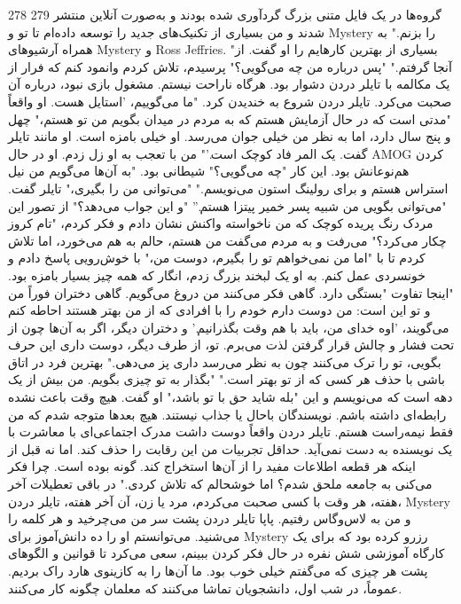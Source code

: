 278
279
گروه‌ها در یک فایل متنی بزرگ گردآوری شده بودند و به‌صورت آنلاین منتشر شدند
و من بسیاری از تکنیک‌های جدید را توسعه داده‌ام تا تو و Mystery را بزنم."
به همراه آرشیوهای Mystery و Ross Jeffries. "بسیاری از بهترین کارهایم را
او گفت.
از آنجا گرفتم."
"پس درباره من چه می‌گویی؟" پرسیدم، تلاش کردم وانمود کنم که
فرار از یک مکالمه با تایلر دردن دشوار بود. هرگاه
ناراحت نیستم.
مشغول بازی نبود، درباره آن صحبت می‌کرد.
تایلر دردن شروع به خندیدن کرد. "ما می‌گوییم، 'استایل هست. او واقعاً
"مدتی است که در حال آزمایش هستم که به مردم در میدان بگویم من تو هستم،"
چهل و پنج سال دارد، اما به نظر من خیلی جوان می‌رسد. او خیلی بامزه است. او مانند
تایلر گفت.
یک المر فاد کوچک است.’"
من با تعجب به او زل زدم. او در حال AMOG کردن هم‌نوعانش بود. این کار
"چه می‌گویی؟"
شیطانی بود.
"به آن‌ها می‌گویم من نیل استراس هستم و برای رولینگ استون می‌نویسم."
"می‌توانی من را بگیری،" تایلر گفت. "می‌توانی بگویی من شبیه پسر خمیر پیتزا هستم.”
"و این جواب می‌دهد؟" از تصور این مردک رنگ پریده کوچک که
من ناخواسته واکنش نشان دادم و فکر کردم، "تام کروز چکار می‌کرد؟"
می‌رفت و به مردم می‌گفت من هستم، حالم به هم می‌خورد، اما تلاش کردم تا با
"اما من نمی‌خواهم تو را بگیرم، دوست من،" با خوش‌رویی پاسخ دادم و
خونسردی عمل کنم.
به او یک لبخند بزرگ زدم، انگار که همه چیز بسیار بامزه بود. "اینجا تفاوت
"بستگی دارد. گاهی فکر می‌کنند من دروغ می‌گویم. گاهی دختران فوراً
من و تو این است: من دوست دارم خودم را با افرادی که از من بهتر هستند احاطه کنم
می‌گویند، 'اوه خدای من، باید با هم وقت بگذرانیم.' و دختران دیگر، اگر به آن‌ها
چون از تحت فشار و چالش قرار گرفتن لذت می‌برم. تو، از طرف دیگر، دوست داری
این حرف بگویی، تو را ترک می‌کنند چون به نظر می‌رسد داری پز می‌دهی."
بهترین فرد در اتاق باشی با حذف هر کسی که از تو بهتر است."
"بگذار به تو چیزی بگویم. من بیش از یک دهه است که می‌نویسم و این
"بله شاید حق با تو باشد،" او گفت.
هیچ وقت باعث نشده رابطه‌ای داشته باشم. نویسندگان باحال یا جذاب نیستند. هیچ
بعدها متوجه شدم که من فقط نیمه‌راست هستم. تایلر دردن واقعاً دوست داشت
مدرک اجتماعی‌ای با معاشرت با یک نویسنده به دست نمی‌آید. حداقل تجربیات من این
رقابت را حذف کند. اما نه قبل از اینکه هر قطعه اطلاعات مفید را از آن‌ها استخراج کند.
گونه بوده است. چرا فکر می‌کنی به جامعه ملحق شدم؟ اما خوشحالم که تلاش کردی."
در باقی تعطیلات آخر هفته، هر وقت با کسی صحبت می‌کردم، مرد یا زن،
آن آخر هفته، تایلر دردن، Mystery و من به لاس‌وگاس رفتیم. پاپا
تایلر دردن پشت سر من می‌چرخید و هر کلمه را می‌شنید. می‌توانستم او را
ده دانش‌آموز برای Mystery رزرو کرده بود که برای یک کارگاه آموزشی شش نفره
در حال فکر کردن ببینم، سعی می‌کرد تا قوانین و الگوهای پشت هر چیزی که می‌گفتم
خیلی خوب بود. ما آن‌ها را به کازینوی هارد راک بردیم. عموماً، در شب اول، دانشجویان تماشا می‌کنند که معلمان چگونه کار می‌کنند.
